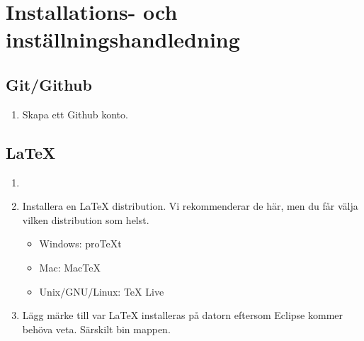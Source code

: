 \documentclass[11pt]{amsart}
\begin{document}
\section{Installations- och inst\"{a}llningshandledning}

\subsection{Git/Github}
\begin{enumerate}
\item Skapa ett Github konto. \\
\end{enumerate}

\subsection{LaTeX}
\begin{enumerate}
\item[] {}
\item Installera en LaTeX distribution. Vi rekommenderar de h\"{a}r, men du f\r{a}r v\"{a}lja vilken distribution som helst.
	\begin{itemize}
	\item Windows: proTeXt {}
	\item Mac: MacTeX {}
	\item Unix/GNU/Linux: TeX Live {} \\
	\end{itemize}
\item L\"{a}gg m\"{a}rke till var LaTeX installeras p\r{a} datorn eftersom Eclipse kommer beh\"{o}va veta. S\"{a}rskilt bin mappen.
\end{enumerate}
\end{document}
